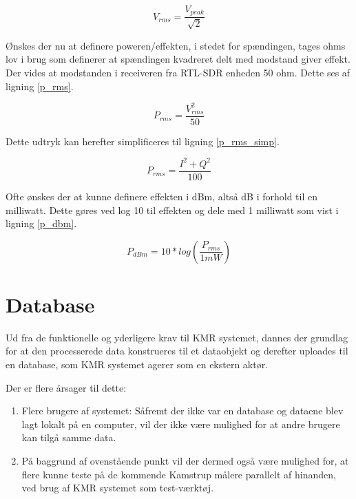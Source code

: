 \begin{appendices}
\begin{equation} \label{v_rms}
V_{rms} = \frac{V_{peak}}{\sqrt{2}}
\end{equation}

Ønskes der nu at definere poweren/effekten, i stedet for spændingen, tages ohms lov i brug som definerer at spændingen kvadreret delt med modstand giver effekt. Der vides at modstanden i receiveren fra RTL-SDR enheden 50 ohm. Dette ses af ligning \ref{p_rms}.

\begin{equation} \label{p_rms}
P_{rms} = \frac{V_{rms}^2}{50}
\end{equation}

Dette udtryk kan herefter simplificeres til ligning \ref{p_rms_simp}.

\begin{equation} \label{p_rms_simp}
P_{rms} = \frac{I^2 + Q^2}{100}
\end{equation}

Ofte ønskes der at kunne definere effekten i dBm, altså dB i forhold til en milliwatt. Dette gøres ved log 10 til effekten og dele med 1 milliwatt som vist i ligning \ref{p_dbm}.

\begin{equation} \label{p_dbm}
P_{dBm} = 10 * log(\frac{P_{rms}}{1mW}) 
\end{equation}

\pagebreak
\section{Database} \label{appendix::studycase::database}
Ud fra de funktionelle og yderligere krav til KMR systemet, dannes der grundlag for at den processerede data konstrueres til et dataobjekt og derefter uploades til en database, som KMR systemet agerer som en ekstern aktør. \newline

Der er flere årsager til dette:

\begin{enumerate}
	\item Flere brugere af systemet: Såfremt der ikke var en database og dataene blev lagt lokalt på en computer, vil der ikke være mulighed for at andre brugere kan tilgå samme data.
	\item På baggrund af ovenstående punkt vil der dermed også være mulighed for, at flere kunne teste på de kommende Kamstrup målere parallelt af hinanden, ved brug af KMR systemet som test-værktøj.
\end{enumerate}


\end{appendices}
